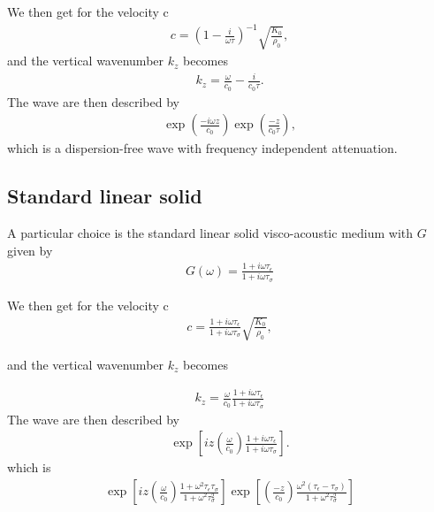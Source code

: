 \documentclass[11pt]{article}
\begin{document}
We then get for the velocity c
\begin{eqnarray}
 c=\left(1-\frac{i}{\omega\tau}\right)^{-1}\sqrt{\frac{K_0}{\rho_0}},
                               \label{eq:23}
\end{eqnarray}
 and the vertical wavenumber $k_z$ becomes
\begin{eqnarray}
 k_z = \frac{\omega}{c_0} - \frac{i}{c_0\tau}.
                               \label{eq:24}
\end{eqnarray}
The wave are then described by
\begin{eqnarray}
 \exp\left(\frac{-i\omega z}{c_0}\right)\exp(\frac{-z}{c_0\tau}),
                               \label{eq:25}
\end{eqnarray}
 which is a dispersion-free wave with frequency independent
 attenuation.
\subsection*{Standard linear solid}
A particular choice is the standard linear solid visco-acoustic
medium with $G$ given by \citep{Casula1992}
\begin{eqnarray}
 G(\omega) = \frac{1+i\omega\tau_{\epsilon}}{1+i\omega\tau_{\sigma}}
\end{eqnarray}

We then get for the velocity c
\begin{eqnarray}
 c=\frac{1+i\omega\tau_{\epsilon}}{1+i\omega\tau_{\sigma}}
\sqrt{\frac{K_0}{\rho_0}},
\end{eqnarray}

 and the vertical wavenumber $k_z$ becomes

\begin{eqnarray}
 k_z = \frac{\omega}{c_0}\frac{1+i\omega\tau_{\epsilon}}{1+i\omega\tau_{\sigma}}
\end{eqnarray}
The wave are then described by
\begin{eqnarray}
 \exp\left[iz \left(\frac{\omega}{c_0}\right)
      \frac{1+i\omega\tau_{\epsilon}}{1+i\omega\tau_{\sigma}}
     \right].
\end{eqnarray}
which is 
\begin{eqnarray}
 \exp\left[iz\left(\frac{\omega}{c_0}\right)
             \frac{1+\omega^2\tau_{\epsilon}\tau_{\sigma}}
                  {1+\omega^2\tau^2_{\sigma}}
             \right]
 \exp\left[\left(\frac{-z}{c_0}\right)
             \frac{\omega^2(\tau_{\epsilon}-\tau_{\sigma})}
                  {1+\omega^2\tau^2_{\sigma}}
             \right]
\end{eqnarray}
\end{document}
